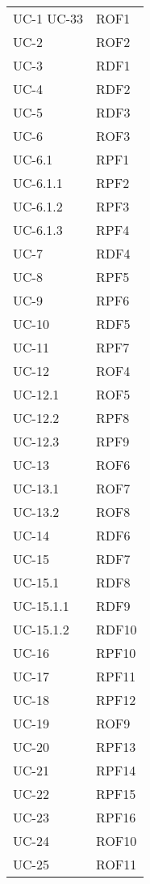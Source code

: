 \begin{longtable}{| p{5cm} | p{5cm} |}
		UC-1 \newline UC-33 & ROF1  \\
		\rowcolor{LightGray}
		UC-2 & ROF2 \\
		UC-3 & RDF1 \\
		\rowcolor{LightGray}
		UC-4 & RDF2 \\
		UC-5 & RDF3 \\
		\rowcolor{LightGray}
		UC-6 & ROF3 \\
		UC-6.1 & RPF1 \\
		\rowcolor{LightGray}
		UC-6.1.1 & RPF2 \\
		UC-6.1.2 & RPF3 \\
		\rowcolor{LightGray}
		UC-6.1.3 & RPF4 \\
		UC-7 & RDF4 \\
		\rowcolor{LightGray}
		UC-8 & RPF5 \\
		UC-9 & RPF6 \\
		\rowcolor{LightGray}
		UC-10 & RDF5 \\
		UC-11 & RPF7 \\
		\rowcolor{LightGray}
		UC-12 & ROF4 \\
		UC-12.1 & ROF5 \\
		\rowcolor{LightGray}
		UC-12.2 & RPF8 \\
		UC-12.3 & RPF9 \\
		\rowcolor{LightGray}
		UC-13 & ROF6 \\
		UC-13.1 & ROF7 \\
		\rowcolor{LightGray}
		UC-13.2 & ROF8 \\
		UC-14 & RDF6\\
		\rowcolor{LightGray}
		UC-15 & RDF7 \\
		UC-15.1 & RDF8\\
		\rowcolor{LightGray}
		UC-15.1.1 & RDF9\\
		UC-15.1.2 & RDF10\\
		\rowcolor{LightGray}
		UC-16 & RPF10\\
		UC-17 & RPF11\\
		\rowcolor{LightGray}
		UC-18 & RPF12 \\
		UC-19 & ROF9 \\
		\rowcolor{LightGray}
		UC-20 & RPF13 \\
		UC-21 & RPF14 \\
		\rowcolor{LightGray}
		UC-22 & RPF15 \\ 
		UC-23 & RPF16\\
		\rowcolor{LightGray}
		UC-24 & ROF10 \\
		UC-25 & ROF11 \\

\end{longtable}
